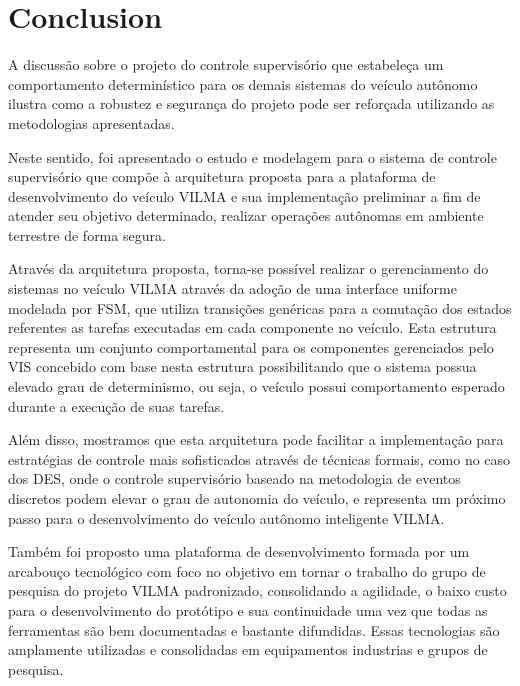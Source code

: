 \documentclass[conference]{IEEEtran}
\begin{document}
\section{Conclusion}\label{sec:conclusion}



A discussão sobre o projeto do controle supervisório que estabeleça um comportamento determinístico para os demais sistemas do veículo autônomo ilustra como a robustez e segurança do projeto pode ser reforçada utilizando as metodologias apresentadas.

Neste sentido, foi apresentado o estudo e modelagem para o sistema de controle supervisório que compõe à arquitetura proposta para a plataforma de desenvolvimento do veículo VILMA e sua implementação preliminar a fim de atender seu objetivo determinado, realizar operações autônomas em ambiente terrestre de forma segura.

Através da arquitetura proposta, torna-se possível realizar o gerenciamento do sistemas no veículo VILMA através da adoção de uma interface uniforme modelada por FSM, que utiliza transições genéricas para a comutação dos estados referentes as tarefas executadas em cada componente no veículo. Esta estrutura representa um conjunto comportamental para os componentes gerenciados pelo VIS concebido com base nesta estrutura possibilitando que o sistema possua elevado grau de determinismo, ou seja, o veículo possui comportamento esperado durante a execução de suas tarefas.

Além disso, mostramos que esta arquitetura pode facilitar a implementação para estratégias de controle mais sofisticados através de técnicas formais, como no caso dos DES, onde o controle supervisório baseado na metodologia de eventos discretos podem elevar o grau de autonomia do veículo, e representa um próximo passo para o desenvolvimento do veículo autônomo inteligente VILMA.

Também foi proposto uma plataforma de desenvolvimento formada por um arcabouço tecnológico com foco no objetivo em tornar o trabalho do grupo de pesquisa do projeto VILMA padronizado, consolidando a agilidade, o baixo custo para o desenvolvimento do protótipo e sua continuidade uma vez que todas as ferramentas são bem documentadas e bastante difundidas. Essas tecnologias são amplamente utilizadas e consolidadas em equipamentos industrias e grupos de pesquisa. 
\end{document}
